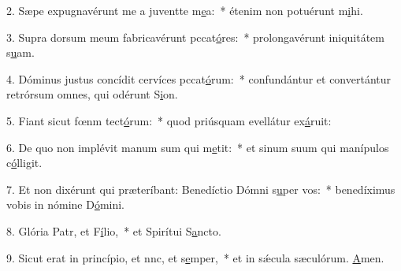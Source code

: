 2. Sæpe expugnavérunt me a juventte m\uline{e}a:~* étenim non potuérunt m\uline{i}hi.\par 
3. Supra dorsum meum fabricavérunt pccat\uline{ó}res:~* prolongavérunt iniquitátem s\uline{u}am.\par 
4. Dóminus justus concídit cervíces pccat\uline{ó}rum:~* confundántur et convertántur retrórsum omnes, qui odérunt S\uline{i}on.\par 
5. Fiant sicut fœnm tect\uline{ó}rum:~* quod priúsquam evellátur ex\uline{á}ruit:\par 
6. De quo non implévit manum sum qui m\uline{e}tit:~* et sinum suum qui manípulos c\uline{ó}lligit.\par 
7. Et non dixérunt qui præteríbant: Benedíctio Dómni s\uline{u}per vos:~* benedíximus vobis in nómine D\uline{ó}mini.\par 
8. Glória Patr, et F\uline{í}lio,~* et Spirítui S\uline{a}ncto.\par 
9. Sicut erat in princípio, et nnc, et s\uline{e}mper,~* et in sǽcula sæculórum. \uline{A}men.\par 

